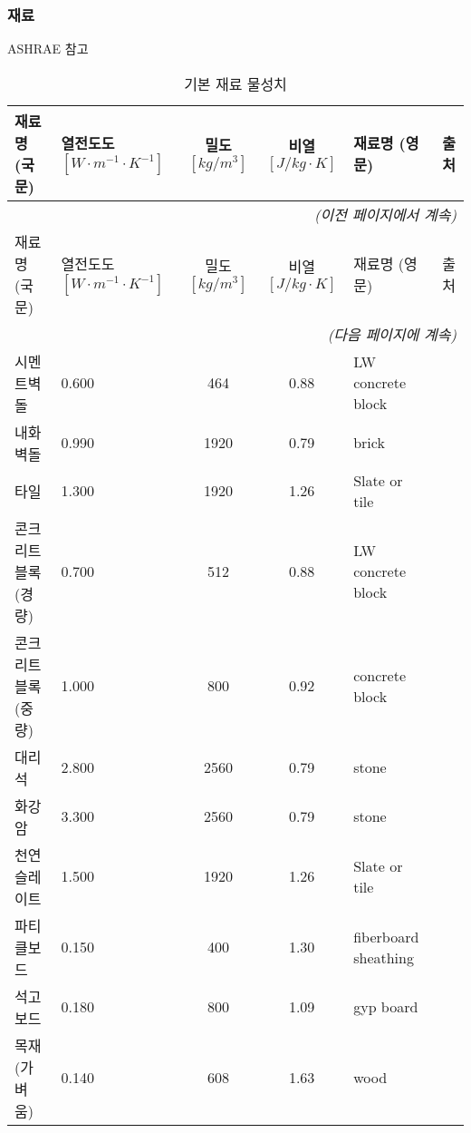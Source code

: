 \subsubsection{재료}
ASHRAE 참고

\renewcommand{\arraystretch}{0.8}
\begin{longtable}{llcclc}
  \caption{기본 재료 물성치} \\
  \toprule
  재료명(국문) & \makecell{열전도도 \\ $[W{\cdot}m^{-1}{\cdot} K^{-1}]$}  & \makecell{밀도 \\ $[kg/m^{3}]$} & \makecell {비열 \\ $[J/kg\cdot K]$} & 재료명 (영문) &  출처 \\ \midrule
  \endfirsthead
  \multicolumn{6}{r}{\textit{(이전 페이지에서 계속)}} \\ \toprule
  재료명(국문) & \makecell{열전도도 \\ $[W{\cdot}m^{-1}{\cdot} K^{-1}]$}  & \makecell{밀도 \\ $[kg/m^{3}]$} & \makecell {비열 \\ $[J/kg\cdot K]$} & 재료명 (영문) & 출처 \\ \midrule
  \endhead
  \midrule \multicolumn{6}{r}{\textit{(다음 페이지에 계속)}} \\ \bottomrule
  \endfoot
  \bottomrule
  \endlastfoot
  시멘트벽돌 &   0.600 &  464 & 0.88 & LW concrete block & \cite{ashrae_f18} \\
  내화벽돌 &   0.990 & 1920 & 0.79 & brick & \cite{ashrae_f18} \\
  타일 &   1.300 & 1920 & 1.26 & Slate or tile & \cite{ashrae_f18} \\
  콘크리트블록(경량) &   0.700 &  512 & 0.88 & LW concrete block & \cite{ashrae_f18} \\
  콘크리트블록(중량) &   1.000 &  800 & 0.92 & concrete block & \cite{ashrae_f18} \\
  대리석 &   2.800 & 2560 & 0.79 & stone & \cite{ashrae_f18} \\
  화강암 &   3.300 & 2560 & 0.79 & stone & \cite{ashrae_f18} \\
  천연슬레이트 &   1.500 & 1920 & 1.26 & Slate or tile & \cite{ashrae_f18} \\
  파티클보드 &   0.150 &  400 & 1.30 & fiberboard sheathing & \cite{ashrae_f18} \\
  석고보드 &   0.180 &  800 & 1.09 & gyp board & \cite{ashrae_f18} \\
  목재(가벼움) &   0.140 &  608 & 1.63 & wood & \cite{ashrae_f18} \\

\end{longtable}
